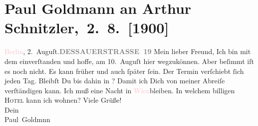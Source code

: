 

         
         \renewcommand{\erwaehntePersonen}{Personen: Alfred Kerr}
         \renewcommand{\erwaehnteOrte}{Orte: Bad Ischl, Berlin, Dessauer Straße, Toblach, Wien}
         \renewcommand{\erwaehnteWerke}{}
               \section[ Paul Goldmann an Arthur Schnitzler, 2. 8. {[}1900{]}]{Paul Goldmann an Arthur Schnitzler, 2. 8. {[}1900{]}}\nopagebreak{}\rehead{ }\normalsize\beginnumbering{} \toendnotes[C]{\smallbreak\pagebreak[2]} 
\toendnotes[C]{\smallbreak}\pstart
           \noindent{}\textcolor{pink}{Berlin}{}\ledrightnote{\textcolor{pink}{Berlin}}, 2. Auguſt.\hfill {\pb}\textcolor{pink}{\textcolor{gray}{\textbf{DESSAUERSTRASSE 19}}}{}\ledrightnote{\textcolor{pink}{Dessauer Straße}}\pend
           \pstart\center{}Mein lieber Freund,\pend\pstart
           Ich bin mit dem \label{K_L02926-1v}\label{K_L02926-1h} einverſtanden und hoffe, am 10. Auguſt hier
               wegzukönnen. Aber beſimmt iſt es noch nicht.  Es kann früher und auch ſpäter ſein. Der Termin verſchiebt ſich jeden Tag.
               Bleibſt Du bis dahin in \label{K_L02926-2v}\label{K_L02926-2h}? Damit ich Dich von meiner
               Abreiſe verſtändigen kann.\pend
           \pstart
           Ich muß eine Nacht in \textcolor{pink}{Wien}{}\ledrightnote{\textcolor{pink}{Wien}}{ }{\pb}bleiben. In welchem billigen \textsc{Hotel} kann ich wohnen?\pend
           \pstart
           Viele Grüße! {\\[\baselineskip]}Dein {\\[\baselineskip]}\spacefill\mbox{Paul Goldmnn}\pend
